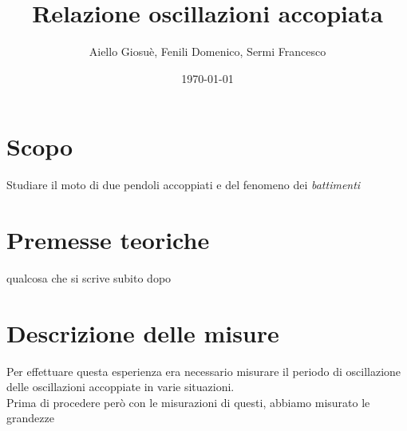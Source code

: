 \documentclass{article}
\title{Relazione oscillazioni accopiata}
\author{Aiello Giosuè, Fenili Domenico, Sermi Francesco}
\date{\today}
\begin{document}
\maketitle
\newpage
\tableofcontents
\section{Scopo}
Studiare il moto di due pendoli accoppiati e del fenomeno dei \emph{battimenti}
\section{Premesse teoriche}
qualcosa che si scrive subito dopo

\section{Descrizione delle misure}

Per effettuare questa esperienza era necessario misurare il periodo di oscillazione delle oscillazioni accoppiate
in varie situazioni. \\
Prima di procedere però con le misurazioni di questi, abbiamo misurato le grandezze 
\end{document}
